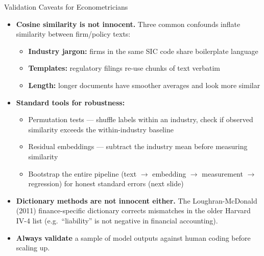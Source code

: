 \begin{frame}{Validation Caveats for Econometricians}
\begin{itemize}
\item \textbf{Cosine similarity is not innocent.} Three common confounds inflate similarity between firm/policy texts:
\begin{itemize}
    \item \textbf{Industry jargon:} firms in the same SIC code share boilerplate language
    \item \textbf{Templates:} regulatory filings re-use chunks of text verbatim
    \item \textbf{Length:} longer documents have smoother averages and look more similar
\end{itemize}

\medskip
\item \textbf{Standard tools for robustness:}
\begin{itemize}
    \item Permutation tests --- shuffle labels within an industry, check if observed similarity exceeds the within-industry baseline
    \item Residual embeddings --- subtract the industry mean before measuring similarity
    \item Bootstrap the entire pipeline (text $\rightarrow$ embedding $\rightarrow$ measurement $\rightarrow$ regression) for honest standard errors (next slide)
\end{itemize}

\medskip
\item \textbf{Dictionary methods are not innocent either.} The Loughran-McDonald (2011) finance-specific dictionary corrects mismatches in the older Harvard IV-4 list (e.g.\ ``liability'' is not negative in financial accounting).

\medskip
\item \textbf{Always validate} a sample of model outputs against human coding before scaling up.
\end{itemize}
\end{frame}

